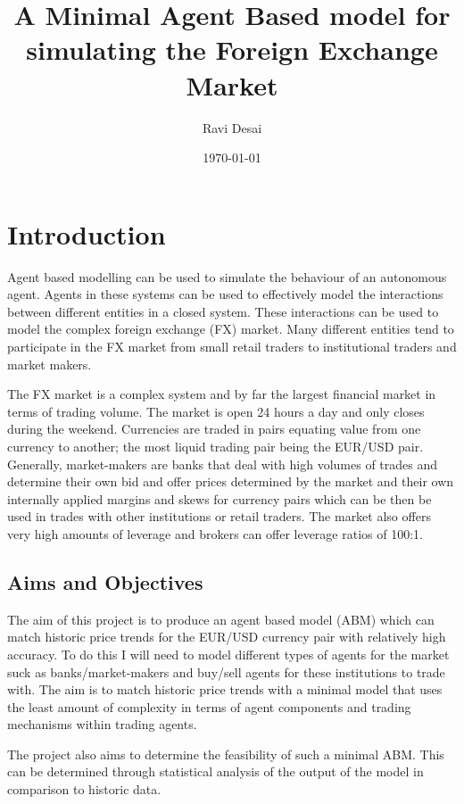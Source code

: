 \documentclass[11pt]{informatics-report}
\title{A Minimal Agent Based model for simulating the Foreign Exchange Market}
\author{Ravi Desai}
\date{\today}
\begin{document}
\createFrontMatter
\onehalfspacing
\tableofcontents
\doublespacing


\chapter{Introduction}
Agent based modelling can be used to simulate the behaviour of an autonomous agent. Agents in these systems can be used to effectively model the interactions between different entities in a closed system. These interactions can be used to model the complex foreign exchange (FX) market. Many different entities tend to participate in the FX market from small retail traders to institutional traders and market makers.

The FX market is a complex system and by far the largest financial market in terms of trading volume. The market is open 24 hours a day and only closes during the weekend. Currencies are traded in pairs equating value from one currency to another; the most liquid trading pair being the EUR/USD pair. Generally, market-makers are banks that deal with high volumes of trades and determine their own bid and offer prices determined by the market and their own internally applied margins and skews for currency pairs which can be then be used in trades with other institutions or retail traders. The market also offers very high amounts of leverage and brokers can offer leverage ratios of 100:1.



\section{Aims and Objectives}
The aim of this project is to produce an agent based model (ABM) which can match historic price trends for the EUR/USD currency pair with relatively high accuracy. To do this I will need to model different types of agents for the market suck as banks/market-makers and buy/sell agents for these institutions to trade with. The aim is to match historic price trends with a minimal model that uses the least amount of complexity in terms of agent components and trading mechanisms within trading agents.

The project also aims to determine the feasibility of such a minimal ABM. This can be determined through statistical analysis of the output of the model in comparison to historic data.
\end{document}
